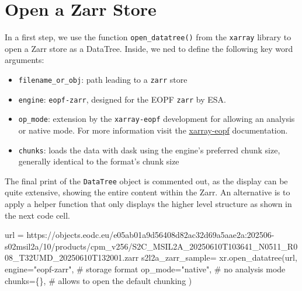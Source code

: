 \documentclass[
  letterpaper,
  DIV=11,
  numbers=noendperiod]{scrreprt}
\newenvironment{Shaded}{\begin{snugshade}}{\end{snugshade}}
\newcommand{\CommentTok}[1]{\textcolor[rgb]{0.37,0.37,0.37}{#1}}
\newcommand{\NormalTok}[1]{\textcolor[rgb]{0.00,0.23,0.31}{#1}}
\newcommand{\OperatorTok}[1]{\textcolor[rgb]{0.37,0.37,0.37}{#1}}
\newcommand{\StringTok}[1]{\textcolor[rgb]{0.13,0.47,0.30}{#1}}
\providecommand{\tightlist}{%
  \setlength{\itemsep}{0pt}\setlength{\parskip}{0pt}}
\begin{document}
\section{Open a Zarr Store}\label{open-a-zarr-store}

In a first step, we use the function \texttt{open\_datatree()} from the
\texttt{xarray} library to open a Zarr store as a DataTree. Inside, we
ned to define the following key word arguments:

\begin{itemize}
\tightlist
\item
  \texttt{filename\_or\_obj}: path leading to a \texttt{zarr} store
\item
  \texttt{engine}:
  \texttt{\textquotesingle{}eopf-zarr\textquotesingle{}}, designed for
  the EOPF \texttt{zarr} by ESA.
\item
  \texttt{op\_mode}: extension by the \texttt{xarray-eopf} development
  for allowing an analysis or native mode. For more information visit
  the
  \href{https://eopf-sample-service.github.io/xarray-eopf/}{xarray-eopf}
  documentation.
\item
  \texttt{chunks}: loads the data with dask using the engine's preferred
  chunk size, generally identical to the format's chunk size
\end{itemize}

The final print of the \texttt{DataTree} object is commented out, as the
display can be quite extensive, showing the entire content within the
Zarr. An alternative is to apply a helper function that only displays
the higher level structure as shown in the next code cell.

\begin{Shaded}
\begin{Highlighting}[]
\NormalTok{url }\OperatorTok{=} \StringTok{\textquotesingle{}https://objects.eodc.eu/e05ab01a9d56408d82ac32d69a5aae2a:202506{-}s02msil2a/10/products/cpm\_v256/S2C\_MSIL2A\_20250610T103641\_N0511\_R008\_T32UMD\_20250610T132001.zarr\textquotesingle{}}
\NormalTok{s2l2a\_zarr\_sample}\OperatorTok{=}\NormalTok{ xr.open\_datatree(url,}
\NormalTok{    engine}\OperatorTok{=}\StringTok{"eopf{-}zarr"}\NormalTok{, }\CommentTok{\# storage format}
\NormalTok{    op\_mode}\OperatorTok{=}\StringTok{"native"}\NormalTok{, }\CommentTok{\# no analysis mode}
\NormalTok{    chunks}\OperatorTok{=}\NormalTok{\{\}, }\CommentTok{\# allows to open the default chunking}
\NormalTok{)}
\end{Highlighting}
\end{Shaded}
\end{document}
